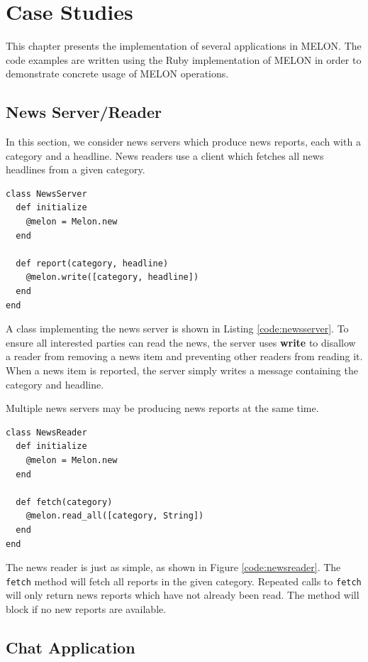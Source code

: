  \chapter{Case Studies}

This chapter presents the implementation of several applications in MELON. The code examples are written using the Ruby implementation of MELON in order to demonstrate concrete usage of MELON operations.

\section{News Server/Reader}

In this section, we consider news servers which produce news reports, each with a category and a headline. News readers use a client which fetches all news headlines from a given category.

\begin{lstlisting}[caption={News Server}, label={code:newsserver}]
class NewsServer
  def initialize
    @melon = Melon.new
  end

  def report(category, headline)
    @melon.write([category, headline])
  end
end
\end{lstlisting}



A class implementing the news server is shown in Listing \ref{code:newsserver}. To ensure all interested parties can read the news, the server uses \textbf{write} to disallow a reader from removing a news item and preventing other readers from reading it. When a news item is reported, the server simply writes a message containing the category and headline.

Multiple news servers may be producing news reports at the same time.

\begin{lstlisting}[caption={News Reader}, label={code:newsreader}]
class NewsReader
  def initialize
    @melon = Melon.new
  end

  def fetch(category)
    @melon.read_all([category, String])
  end
end
\end{lstlisting}

The news reader is just as simple, as shown in Figure \ref{code:newsreader}. The \texttt{fetch} method will fetch all reports in the given category. Repeated calls to \texttt{fetch} will only return news reports which have not already been read. The method will block if no new reports are available.

\section{Chat Application}

